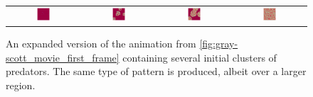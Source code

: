 \begin{figure}[h]
\centering
\mySfFamily
\begin{tabular}{c c c c}
\includegraphics[width = 0.2\textwidth]{../images/f038_100_multi_Moment_1.jpg} & \includegraphics[width = 0.2\textwidth]{../images/f038_100_multi_Moment_2.jpg} & \includegraphics[width = 0.2\textwidth]{../images/f038_100_multi_Moment_3.jpg} & \includegraphics[width = 0.2\textwidth]{../images/f038_100_multi_Moment_4.jpg}
\end{tabular}
\caption{An expanded version of the animation from \autoref{fig:gray-scott_movie_first_frame} containing several initial clusters of predators. The same type of pattern is produced, albeit over a larger region.}
\label{fig:gray-scott_multiple_predators_first_frame}
\end{figure}


